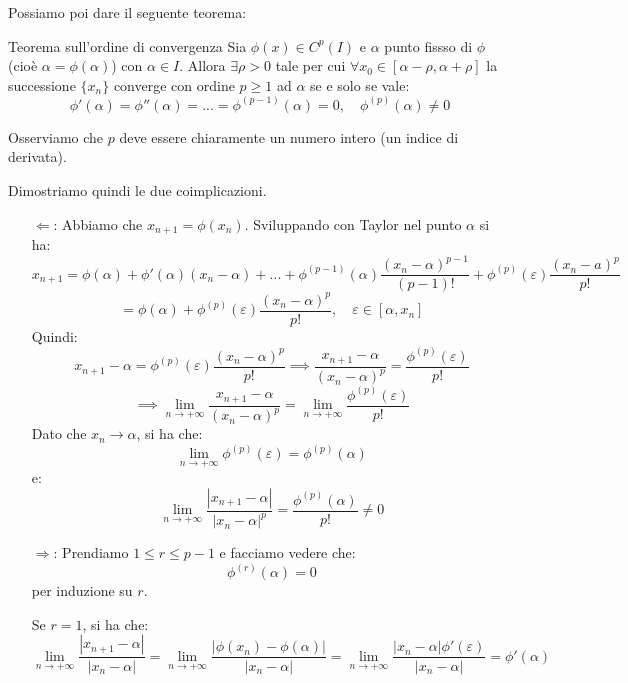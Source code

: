 \documentclass[a4paper,11pt]{article}
\begin{document}
Possiamo poi dare il seguente teorema:
\begin{theorem}{Teorema sull'ordine di convergenza}
	Sia $\phi(x) \in C^p (I)$ e $\alpha$ punto fissso di $\phi$ (cioè $\alpha = \phi(\alpha)$) con $\alpha \in I$.
	Allora $\exists \rho > 0$ tale per cui $\forall x_0 \in [\alpha - \rho, \alpha + \rho]$ la successione $\{x_n\}$ converge con ordine $p \geq 1$ ad $\alpha$ se e solo se vale:
	$$
	\phi'(\alpha) = \phi''(\alpha) = ... = \phi^{(p - 1)}(\alpha) = 0, \quad \phi^{(p)}(\alpha) \neq 0
	$$
\end{theorem}

Osserviamo che $p$ deve essere chiaramente un numero intero (un indice di derivata).

Dimostriamo quindi le due coimplicazioni.
\begin{itemize}
	\item[$\Leftarrow$:] Abbiamo che $x_{n + 1} = \phi(x_n)$. Sviluppando con Taylor nel punto $\alpha$ si ha:
		$$
		x_{n + 1} = \phi(\alpha) + \phi'(\alpha)(x_n - \alpha) + ... + \phi^{(p - 1)}(\alpha) \frac{(x_n - \alpha)^{p - 1}}{(p - 1)!} + \phi^{(p)}(\varepsilon) \frac{(x_n - a)^p}{p!}
		$$
		$$
		= \phi(\alpha) + \phi^{(p)}(\varepsilon) \frac{(x_n - \alpha)^p}{p!}, \quad \varepsilon \in [\alpha, x_n]
		$$
		Quindi:
		$$
		x_{n + 1} - \alpha = \phi^{(p)} (\varepsilon) \frac{(x_n - \alpha)^p}{p!}
		\implies
		\frac{x_{n + 1} - \alpha}{(x_n - \alpha)^p} = \frac{\phi^{(p)}(\varepsilon)}{p!} 
		$$
		$$
		\implies
		\lim_{n \rightarrow + \infty} \frac{x_{n + 1} - \alpha}{(x_n - \alpha)^p} = \lim_{n \rightarrow +\infty} \frac{\phi^{(p)}(\varepsilon)}{p!} 
		$$
		Dato che $x_n \rightarrow \alpha$, si ha che:
		$$
		\lim_{n \rightarrow +\infty} \phi^{(p)} (\varepsilon) = \phi^{(p)} (\alpha)
		$$
		e:
		$$
		\lim_{n \rightarrow +\infty} \frac{|x_{n + 1} - \alpha|}{|x_n - \alpha|^p} = \frac{\phi^{(p)} (\alpha)}{p!} \neq 0
		$$

	\item[$\Rightarrow$:] Prendiamo $1 \leq r \leq p - 1$ e facciamo vedere che:
		$$
			\phi^{(r)} (\alpha) = 0
		$$
		per induzione su $r$.

		Se $r = 1$, si ha che:
		$$
	 	\lim_{n \rightarrow +\infty} \frac{|x_{n + 1} - \alpha|}{|x_n - \alpha|} = \lim_{n \rightarrow +\infty} \frac{|\phi(x_n) - \phi(\alpha)|}{|x_n - \alpha|} = \lim_{n \rightarrow + \infty} \frac{ |x_n - \alpha| \phi'(\varepsilon) }{|x_n - \alpha|} = \phi'(\alpha)
		$$


\end{itemize}
\end{document}

